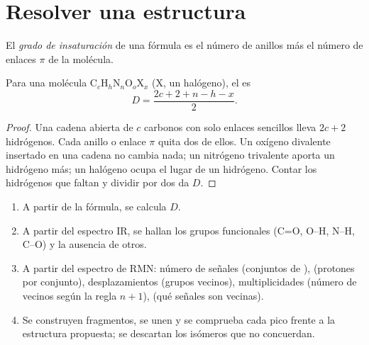 \section{Resolver una estructura}

\begin{definition}\label{def:b1:structure-spectroscopy:unsaturation}
El \emph{grado de insaturación} de una fórmula
es el número de anillos más el número de enlaces $\pi$ de la molécula.
\end{definition}

\begin{proposition}\label{prop:b1:structure-spectroscopy:unsaturation-formula}
Para una molécula $\mathrm{C}_c\mathrm{H}_h\mathrm{N}_n\mathrm{O}_o\mathrm{X}_x$
(X, un halógeno), el  es
\[
  D = \frac{2c + 2 + n - h - x}{2} .
\]
\end{proposition}

\begin{proof}
Una cadena abierta de $c$ carbonos con solo enlaces sencillos lleva
$2c + 2$ hidrógenos. Cada anillo o enlace $\pi$ quita dos de ellos. Un
oxígeno divalente insertado en una cadena no cambia nada; un nitrógeno
trivalente aporta un hidrógeno más; un halógeno ocupa el lugar de un
hidrógeno. Contar los hidrógenos que faltan y dividir por dos da $D$.
\end{proof}

\begin{method}\label{met:b1:structure-spectroscopy:solve-structure}
\begin{enumerate}
  \item A partir de la fórmula, se calcula $D$.
  \item A partir del espectro IR, se hallan los grupos funcionales (C=O,
        O--H, N--H, C--O) y la ausencia de otros.
  \item A partir del espectro de RMN: número de señales (conjuntos de
        ),  (protones por conjunto),
        desplazamientos (grupos vecinos), multiplicidades (número de
        vecinos según la regla $n + 1$),  (qué
        señales son vecinas).
  \item Se construyen fragmentos, se unen y se comprueba cada pico frente
        a la estructura propuesta; se descartan los isómeros que no
        concuerdan.
\end{enumerate}
\end{method}

